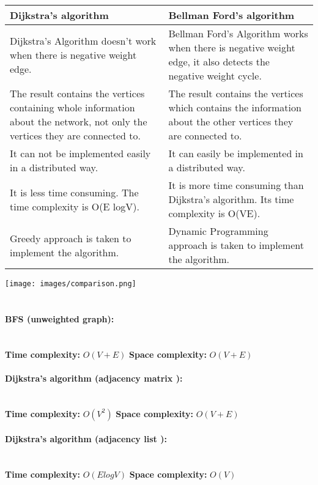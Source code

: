 \documentclass[10pt]{article}
\begin{document}
\begin{multicols*}{2}
 \begin{tabular}{| p{4cm} | p{4cm} |} 
 \hline
 Dijkstra's algorithm & Bellman Ford's algorithm \\ [0.5ex] 
 \hline\hline
 Dijkstra’s Algorithm doesn’t work when there is negative weight edge. & Bellman Ford’s Algorithm works when there is negative weight edge,
it also detects the negative  weight cycle.
 \\ 
 \hline
 The result contains the vertices containing whole information about the network, not only the
vertices they are connected to.
 & The result contains the vertices which contains the information  about the other  vertices they are connected to. \\
 \hline
It can not be implemented easily in
a distributed way.
 & It can easily be implemented in a
distributed way.
 \\
 \hline
 It is less time consuming. The time complexity is O(E logV). & It is more time consuming than Dijkstra’s algorithm. Its time complexity is O(VE). \\
 \hline
Greedy approach is taken to implement the algorithm. & Dynamic Programming approach is taken to
implement the algorithm.
 \\ [1ex] 
 \hline
\end{tabular}

\texttt{[image: images/comparison.png]}\\\\

\paragraph{BFS (unweighted graph):} \\
\textbf{Time complexity: } \(O(V+E)\)
\textbf{Space complexity: } \(O(V+E)\)

\paragraph{Dijkstra's algorithm (adjacency matrix ):} \\
\textbf{Time complexity: } \(O(V^2)\)
\textbf{Space complexity: } \(O(V+E)\)


\paragraph{Dijkstra's algorithm (adjacency list ):} \\
\textbf{Time complexity: } \(O(ElogV)\)
\textbf{Space complexity: } \(O(V)\)


\end{multicols*}
\end{document}

